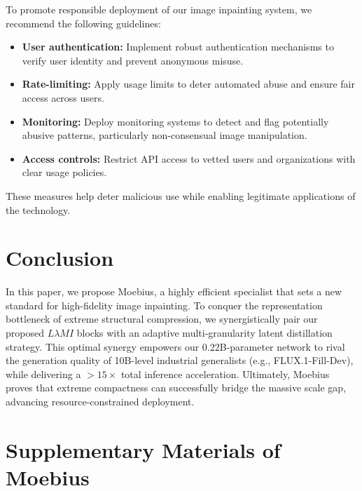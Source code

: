\documentclass{llmxive}
\begin{document}
To promote responsible deployment of our image inpainting system, we recommend the following guidelines:
\begin{itemize}
  \item \textbf{User authentication:} Implement robust authentication mechanisms to verify user identity and prevent anonymous misuse.
  \item \textbf{Rate-limiting:} Apply usage limits to deter automated abuse and ensure fair access across users.
  \item \textbf{Monitoring:} Deploy monitoring systems to detect and flag potentially abusive patterns, particularly non-consensual image manipulation.
  \item \textbf{Access controls:} Restrict API access to vetted users and organizations with clear usage policies.
\end{itemize}
These measures help deter malicious use while enabling legitimate applications of the technology.

\section{Conclusion}\label{sec:conclusion}
\vspace{-0.5em}


In this paper, we propose Moebius, a highly efficient specialist that sets a new standard for high-fidelity image inpainting. To conquer the representation bottleneck of extreme structural compression, we synergistically pair our proposed $L\lambda MI$ blocks with an adaptive multi-granularity latent distillation strategy. This optimal synergy empowers our 0.22B-parameter network to rival the generation quality of 10B-level industrial generalists (e.g., FLUX.1-Fill-Dev), while delivering a $>15\times$ total inference acceleration. Ultimately, Moebius proves that extreme compactness can successfully bridge the massive scale gap, advancing resource-constrained deployment.


%
%
 






\section*{Supplementary Materials of Moebius}
% 
% 
\end{document}
